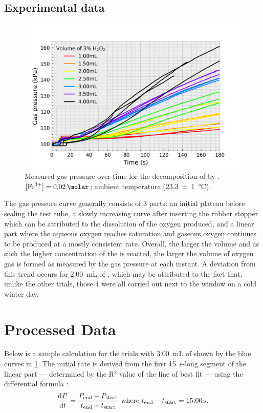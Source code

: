 \documentclass[a4paper, 12pt]{article}
\begin{document}
\subsection*{Experimental data}
\begin{figure}[H]
    \centering
    \includegraphics[width=\textwidth]{data/raw_data}
    \caption{Measured gas pressure over time for the decomposition of  by . $[\ce{Fe^{3+}}] = \SI{0.02}{\molar}$; ambient temperature (\SI{23.3(10)}{\celsius}). }
    \label{fig:raw-data}
\end{figure}

The gas pressure curve generally consists of 3 parts: an initial plateau before sealing the test tube, a slowly increasing curve after inserting the rubber stopper which can be attributed to the dissolution of the oxygen produced, and a linear part where the aqueous oxygen reaches saturation and gaseous oxygen continues to be produced at a mostly consistent rate. Overall, the larger the volume and as such the higher concentration of the  is reacted, the larger the volume of oxygen gas is formed as measured by the gas pressure at each instant. A deviation from this trend occurs for \SI{2.00}{\mL} of , which may be attributed to the fact that, unlike the other trials, those 4 were all carried out next to the window on a cold winter day.

\section*{Processed Data}
Below is a sample calculation for the trials with \SI{3.00}{\mL} of  shown by the blue curves in \cref{fig:raw-data}. The initial rate is derived from the first \SI{15}{\s}-long segment of the linear part --- determined by the R$^2$ value of the line of best fit --- using the differential formula \autocite{numerical_method}:
\[ 
    \dv{P}{t} 
    = \dfrac{ P_{ \text{end} } - P_{ \text{start} } }{ t_{ \text{end} } - t_{ \text{start} } }
    \text{ where } t_{ \text{end} } - t_{ \text{start} } = \SI{15.00}{\s}. 
\]
\end{document}
